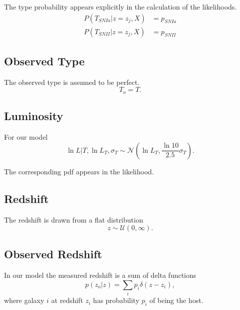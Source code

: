 \documentclass[preprint,3p]{elsarticle}
\begin{document}
The type probability appears explicitly in the calculation of the likelihoods.
\begin{align}
P(T_{SNIa} | z=z_j, X) &= p_{SNIa}\\
P(T_{SNII} | z=z_j, X) &= p_{SNII}
\end{align}
\subsection{Observed Type}
The observed type is assumed to be perfect.
\begin{equation}
T_o = T.
\end{equation}

\subsection{Luminosity}
For our model
\begin{equation}
\ln{L} | T, \ln{L}_{T},\sigma_{T} \sim \mathcal{N}\left( \ln{L}_{T},\frac{\ln{10}}{2.5}\sigma_{T}\right).
\end{equation}

The corresponding pdf appears in the likelihood.

\subsection{Redshift}
The redshift is drawn from a flat distribution
\begin{equation}
z\sim \mathcal{U}(0,\infty).
\end{equation}
%

\subsection{Observed Redshift}
In our model the measured redshift is a sum of delta functions
\begin{equation}
p(z_o|z) = \sum_i p_i \delta(z-z_i),
\end{equation}
where galaxy $i$ at
redshift $z_i$ has probability $p_i$ of being
the host.  
\end{document}
